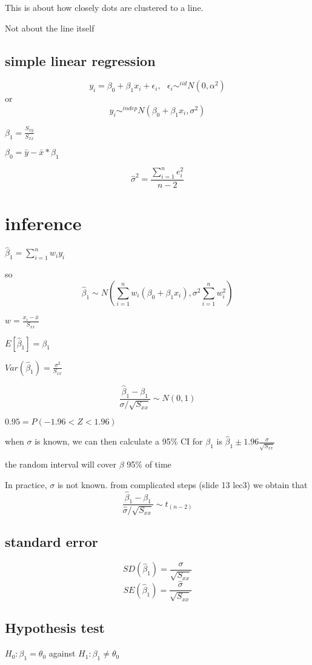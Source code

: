 \documentclass[10pt]{article}
\theoremstyle{break}
\begin{document}
This is about how closely dots are clustered to a line.

Not about the line itself

\subsection{simple linear regression}
$$y_i=\beta_0+\beta_1x_i+\epsilon_i, ~~~ \epsilon_i\sim^{iid}N(0,\alpha^2)$$
or 
$$y_i\sim^{indep}N(\beta_0+\beta_1x_i,\sigma^2)$$

$\beta_1=\frac{S_{xy}}{S_{xx}}$

$\beta_0=\bar{y}-\bar{x}*\beta_1$

$$\hat\sigma^2=\frac{\sum^n_{i=1}e_i^2}{n-2}$$

\section{inference}
$\hat{\beta}_1=\sum_{i=1}^nw_iy_i$

so $$\hat\beta_1\sim N(\sum^n_{i=1}w_i(\beta_0+\beta_1x_i),\sigma^2\sum_{i=1}^nw_i^2)$$

$w=\frac{x_i-\bar {x}}{S_{xx}}$

$E[\hat\beta_1]=\beta_1$

$Var(\hat\beta_1)=\frac{\sigma^2}{S_{xx}}$

$$\frac{\hat\beta_1-\beta_1}{\sigma/\sqrt{S_{xx}}}\sim N(0,1)$$

$0.95=P(-1.96< Z < 1.96)$

when $\sigma$ is known,
we can then calculate a 95\% CI for $\beta_1$ is $\hat\beta_1\pm1.96\frac{\sigma}{\sqrt{S_{xx}}}$

the random interval will cover $\beta$ 95\% of time


In practice, $\sigma$ is not known.
from complicated steps (slide 13 lec3) we obtain that 
$$\frac{\hat\beta_1-\beta_1}{\hat\sigma/\sqrt{S_{xx}}}\sim t_{(n-2)}$$


\subsection{standard error}
$$SD(\hat\beta_1)=\frac{\sigma}{\sqrt{S_{xx}}}$$
$$SE(\hat\beta_1)=\frac{\hat\sigma}{\sqrt{S_{xx}}}$$

\subsection{Hypothesis test}
$H_0: \beta_1=\theta_0$ against $H_1: \beta_1 \neq \theta_0$
\end{document}
